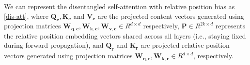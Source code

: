 We can represent the disentangled self-attention with relative position bias as \eqref{dis-att}, 
where $\bm{Q_c}, \bm{K_c}$ and $\bm{V_c}$  are the projected content vectors generated using projection matrices $\bm{W_{q,c}},\bm{W_{k,c}} ,\bm{W_{v,c}}\in R^{d \times d}$ respectively, 
$\bm{P} \in R^{2k \times d}$ represents the relative position embedding vectors shared across all layers (i.e., staying fixed during forward propagation), 
and $\bm{Q_r}$ and $\bm{K_r}$ are projected relative position vectors generated using projection matrices $\bm{W_{q,r}},\bm{W_{k,r}} \in R^{d \times d}$, respectively.   


